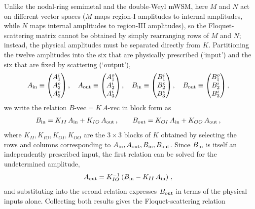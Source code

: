 \documentclass[aps,prb,onecolumn,longbibliography,nofootinbib,citeautoscript,10pt]{revtex4-2}
\begin{document}
Unlike the nodal-ring semimetal and the double-Weyl mWSM, here $M$ and $N$ act on different vector spaces ($M$ maps region-I amplitudes to internal amplitudes, while $N$ maps internal amplitudes to region-III amplitudes), so the Floquet-scattering matrix cannot be obtained by simply rearranging rows of $M$ and $N$; instead, the physical amplitudes must be separated directly from $K$. Partitioning the twelve amplitudes into the six that are physically prescribed (`input') and the six that are fixed by scattering (`output'),
\begin{align}
A_{\rm in} \equiv \begin{pmatrix} A_1^i\\A_2^o\\A_3^o\end{pmatrix}, \quad
A_{\rm out} \equiv \begin{pmatrix} A_1^o\\A_2^i\\A_3^i\end{pmatrix}, \quad
B_{\rm in} \equiv \begin{pmatrix} B_1^i\\B_2^o\\B_3^o\end{pmatrix}, \quad
B_{\rm out} \equiv \begin{pmatrix} B_1^o\\B_2^i\\B_3^i\end{pmatrix},
\end{align}
we write the relation $B\text{-vec}=K\,A\text{-vec}$ in block form as
\begin{align}
B_{\rm in} = K_{II}\,A_{\rm in} + K_{IO}\,A_{\rm out}\,, \qquad
B_{\rm out} = K_{OI}\,A_{\rm in} + K_{OO}\,A_{\rm out}\,,
\end{align}
where $K_{II},K_{IO},K_{OI},K_{OO}$ are the $3\times3$ blocks of $K$ obtained by selecting the rows and columns corresponding to $A_{\rm in}, A_{\rm out}, B_{\rm in}, B_{\rm out}$. Since $B_{\rm in}$ is itself an independently prescribed input, the first relation can be solved for the undetermined amplitude,
\begin{align}
A_{\rm out} = K_{IO}^{-1}\left(B_{\rm in} - K_{II}\, A_{\rm in}\right)\,,
\end{align}
and substituting into the second relation expresses $B_{\rm out}$ in terms of the physical inputs alone. Collecting both results gives the Floquet-scattering relation
\end{document}
